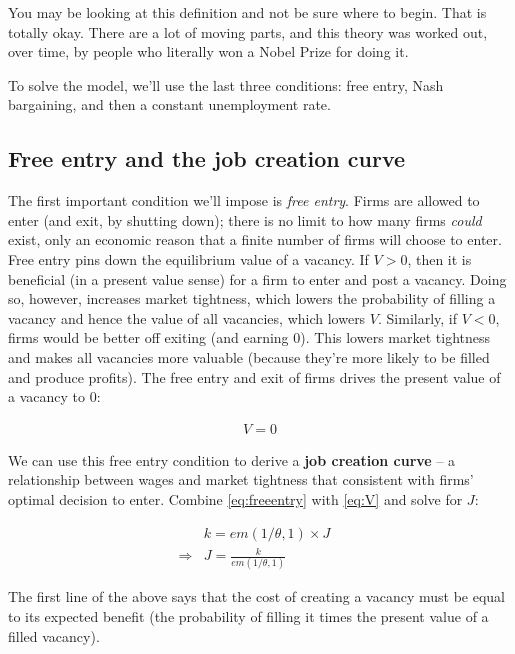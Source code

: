 \documentclass[12pt]{article}
\begin{document}
You may be looking at this definition and not be sure where to begin. That is totally okay. There are a lot of moving parts, and this theory was worked out, over time, by people who literally won a Nobel Prize for doing it.

To solve the model, we'll use the last three conditions: free entry, Nash bargaining, and then a constant unemployment rate.

\subsection*{Free entry and the job creation curve}

The first important condition we'll impose is \textit{free entry}.  Firms are allowed to enter (and exit, by shutting down); there is no limit to how many firms \textit{could} exist, only an economic reason that a finite number of firms will choose to enter. Free entry pins down the equilibrium value of a vacancy.  If $V > 0 $, then it is beneficial (in a present value sense) for a firm to enter and post a vacancy.  Doing so, however, increases market tightness, which lowers the probability of filling a vacancy and hence the value of all vacancies, which lowers $V$.  Similarly, if $V < 0 $, firms would be better off exiting (and earning 0). This lowers market tightness and makes all vacancies more valuable (because they're more likely to be filled and produce profits).   The free entry and exit of firms drives the present value of a vacancy to 0:

\begin{equation}\label{eq:freeentry}
	\begin{aligned}
V = 0
	\end{aligned}
\end{equation}

We can use this free entry condition to derive a \textbf{job creation curve} -- a relationship between wages and market tightness that consistent with firms' optimal decision to enter. Combine \eqref{eq:freeentry} with \eqref{eq:V} and solve for $J$:

\begin{equation*}
	\begin{aligned}
		&k = em(1/\theta,1)\times J &\\
		\Rightarrow &J = \frac{k}{em(1/\theta,1)}&
	\end{aligned}
\end{equation*}

The first line of the above says that the cost  of creating a vacancy must be equal to its expected benefit (the probability of filling it times the present value of a filled vacancy).
\end{document}
